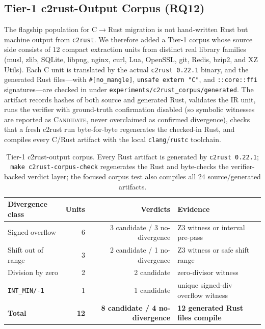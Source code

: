 \documentclass[10pt,a4paper]{article}
\begin{document}


\subsection{Tier-1 c2rust-Output Corpus (RQ12)}\label{sec:eval-c2rust-corpus}

The flagship population for C$\to$Rust migration is not hand-written Rust but
machine output from \texttt{c2rust}. We therefore added a Tier-1 corpus whose
source side consists of 12 compact extraction units from distinct real library
families (musl, zlib, SQLite, libpng, nginx, curl, Lua, OpenSSL, git, Redis,
bzip2, and XZ Utils). Each C unit is translated by the actual
\texttt{c2rust 0.22.1} binary, and the generated Rust files---with
\texttt{\#[no\_mangle]}, \texttt{unsafe extern "C"}, and
\texttt{::core::ffi} signatures---are checked in under
\texttt{experiments/c2rust\_corpus/generated}. The artifact records hashes of
both source and generated Rust, validates the IR unit, runs the verifier with
ground-truth confirmation disabled (so symbolic witnesses are reported as
\textsc{Candidate}, never overclaimed as confirmed divergence), checks that a
fresh c2rust run byte-for-byte regenerates the checked-in Rust, and compiles
every C/Rust artifact with the local \texttt{clang}/\texttt{rustc} toolchain.

\begin{table}[t]
\centering
\small
\caption{Tier-1 c2rust-output corpus. Every Rust artifact is generated by
\texttt{c2rust 0.22.1}; \texttt{make c2rust-corpus-check} regenerates the Rust
and byte-checks the verifier-backed verdict layer; the focused corpus test also
compiles all 24 source/generated artifacts.}
\label{tab:c2rust-corpus}
\begin{tabular}{@{}lrrl@{}}
\toprule
Divergence class & Units & Verdicts & Evidence \\
\midrule
Signed overflow & 6 & 3 candidate / 3 no-divergence & Z3 witness or interval pre-pass \\
Shift out of range & 3 & 2 candidate / 1 no-divergence & Z3 witness or safe shift range \\
Division by zero & 2 & 2 candidate & zero-divisor witness \\
\texttt{INT\_MIN/-1} & 1 & 1 candidate & unique signed-div overflow witness \\
\midrule
\textbf{Total} & \textbf{12} & \textbf{8 candidate / 4 no-divergence} &
\textbf{12 generated Rust files compile} \\
\bottomrule
\end{tabular}
\end{table}
\end{document}
